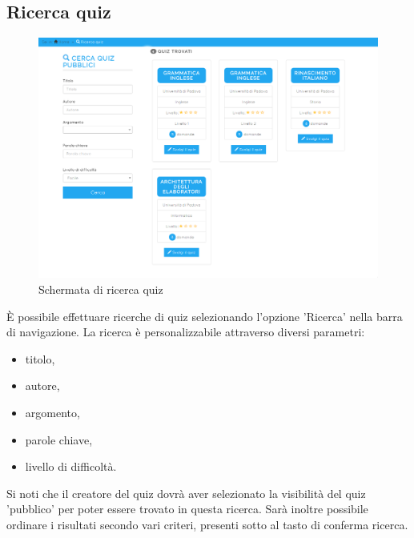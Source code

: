 \documentclass[a4paper, titlepage]{article}
\begin{document}
	\subsection{Ricerca quiz}
	\begin{figure}[!h]
		\centering
		\includegraphics[scale=0.33]{Img/screen_RicercaQuiz.png}
		\caption{Schermata di ricerca quiz}
	\end{figure}
	 È possibile effettuare ricerche di quiz selezionando l'opzione 'Ricerca' nella barra di navigazione. La ricerca è personalizzabile attraverso diversi parametri:
	 \begin{itemize}
	 	\item titolo,
	 	\item autore,
	 	\item argomento,
	 	\item parole chiave,
	 	\item livello di difficoltà.
	 \end{itemize}
	 Si noti che il creatore del quiz dovrà aver selezionato la visibilità del quiz 'pubblico' per poter essere trovato in questa ricerca. Sarà inoltre possibile ordinare i risultati secondo vari criteri, presenti sotto al tasto di conferma ricerca.
	 
	 \newpage
\end{document}
